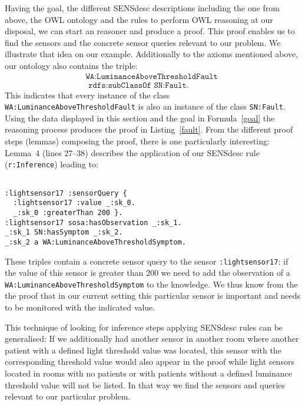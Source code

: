 Having the goal, the different SENSdesc descriptions including the one from above, the OWL ontology and the \nthree rules to perform OWL reasoning 
at our disposal, we can start an \nthree 
reasoner and produce a proof. 
This proof enables us to find the sensors and the concrete sensor queries relevant to our problem. We illustrate that idea on  our example.
Additionally to the axioms mentioned above, our ontology also contains the triple:
\begin{multline}
\texttt{WA:LuminanceAboveThresholdFault }\\ \texttt{ rdfs:subClassOf SN:Fault.}
\end{multline}
This indicates that every instance of the class \texttt{WA:LuminanceAboveThresholdFault} is also an instance of the class \texttt{SN:Fault}.
Using the data displayed in this section and the goal in Formula~\ref{goal} the reasoning process produces the proof in Listing~\ref{fault}. 
From the different proof steps (lemmas) composing the proof, there is one particularly interesting:  Lemma~4 (lines 27--38) describes 
the application of our SENSdesc rule (\texttt{r:Inference}) leading to:
%
\small
\begin{verbatim}

:lightsensor17 :sensorQuery {
  :lightsensor17 :value _:sk_0.
  _:sk_0 :greaterThan 200 }.
:lightsensor17 sosa:hasObservation _:sk_1.
_:sk_1 SN:hasSymptom _:sk_2.
_:sk_2 a WA:LuminanceAboveThresholdSymptom.

\end{verbatim}
\normalsize
%
These triples contain a concrete sensor query to the sensor \texttt{:lightsensor17}: 
if the value of this sensor is greater than 200 we need to add
the observation of a \texttt{WA:LuminanceAboveThresholdSymptom} 
to the knowledge. 
We thus know from the the proof that in our current setting 
this particular sensor is important and needs to be monitored with the indicated value. 

This technique of looking for inference steps applying SENSdesc rules can be generalised: 
If we additionally had another sensor in another room where another patient with a defined light threshold value was located, 
this sensor with the corresponding threshold value 
would also appear in the proof while light sensors located in rooms with no patients or with patients 
without a defined luminance threshold value will not be listed. In that way we find the sensors and queries relevant to our particular problem.

